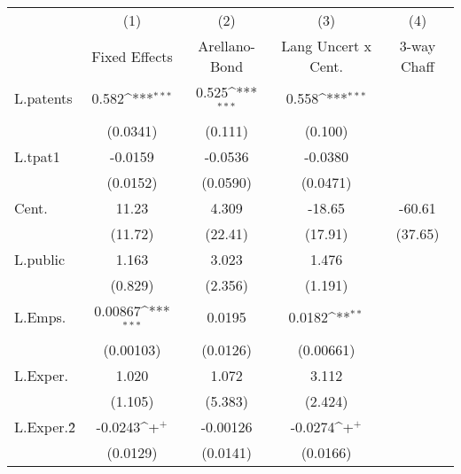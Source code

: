 {
\def\sym#1{\ifmmode^{#1}\else\(^{#1}\)\fi}
\begin{tabular}{l*{4}{c}}
\hline\hline
                    &\multicolumn{1}{c}{(1)}&\multicolumn{1}{c}{(2)}&\multicolumn{1}{c}{(3)}&\multicolumn{1}{c}{(4)}\\
                    &\multicolumn{1}{c}{Fixed Effects}&\multicolumn{1}{c}{Arellano-Bond}&\multicolumn{1}{c}{Lang Uncert x Cent.}&\multicolumn{1}{c}{3-way Chaff}\\
\hline
L.patents           &       0.582\sym{***}&       0.525\sym{***}&       0.558\sym{***}&                     \\
                    &    (0.0341)         &     (0.111)         &     (0.100)         &                     \\
L.tpat1             &     -0.0159         &     -0.0536         &     -0.0380         &                     \\
                    &    (0.0152)         &    (0.0590)         &    (0.0471)         &                     \\
Cent.               &       11.23         &       4.309         &      -18.65         &      -60.61         \\
                    &     (11.72)         &     (22.41)         &     (17.91)         &     (37.65)         \\
L.public            &       1.163         &       3.023         &       1.476         &                     \\
                    &     (0.829)         &     (2.356)         &     (1.191)         &                     \\
L.Emps.             &     0.00867\sym{***}&      0.0195         &      0.0182\sym{**} &                     \\
                    &   (0.00103)         &    (0.0126)         &   (0.00661)         &                     \\
L.Exper.            &       1.020         &       1.072         &       3.112         &                     \\
                    &     (1.105)         &     (5.383)         &     (2.424)         &                     \\
L.Exper.\^2         &     -0.0243\sym{+}  &    -0.00126         &     -0.0274\sym{+}  &                     \\
                    &    (0.0129)         &    (0.0141)         &    (0.0166)         &                     \\

\end{tabular}}
